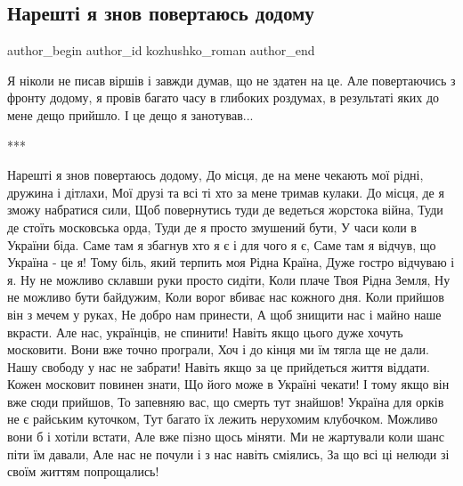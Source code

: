  
 
 
 
 
 
\subsection{Нарешті я знов повертаюсь додому}
\label{sec:30_11_2022.fb.kozhushko_roman.1.dodomu}
 
\ifcmt
 author_begin
   author_id kozhushko_roman
 author_end
\fi

Я ніколи не писав віршів і завжди думав, що не здатен на це. Але повертаючись з
фронту додому, я провів багато часу в глибоких роздумах, в результаті яких до
мене дещо прийшло. І це дещо я занотував...

***

\obeycr
Нарешті я знов повертаюсь додому,
До місця, де на мене чекають мої рідні, дружина і дітлахи,
Мої друзі та всі ті хто за мене тримав кулаки.
До місця, де я зможу набратися сили, 
Щоб повернутись туди де ведеться жорстока війна,
Туди де стоїть московська орда, 
Туди де я просто змушений бути,
У часи коли в України біда.
Саме там я збагнув хто я є і для чого я є, 
Саме там я відчув, що Україна - це я!
Тому біль, який терпить моя Рідна Країна,
Дуже гостро відчуваю і я.
Ну не можливо склавши руки просто сидіти,
Коли плаче Твоя Рідна Земля,
Ну не можливо бути байдужим,
Коли ворог вбиває нас кожного дня.
Коли прийшов він з мечем у руках,
Не добро нам принести, 
А щоб знищити нас і майно наше вкрасти.
Але нас, українців, не спинити!
Навіть якщо цього дуже хочуть московити.
Вони вже точно програли,
Хоч і до кінця ми їм тягла ще не дали.
Нашу свободу у нас не забрати!
Навіть якщо за це прийдеться життя віддати.
Кожен московит повинен знати,
Що його може в Україні чекати!
І тому якщо він вже сюди прийшов,
То запевняю вас, що смерть тут знайшов! Україна для орків не є райським куточком,
Тут багато їх лежить нерухомим клубочком.
Можливо вони б і хотіли встати,
Але вже пізно щось міняти.
Ми не жартували коли шанс піти їм давали,
Але нас не почули і з нас навіть сміялись,
За що всі ці нелюди зі своїм життям попрощались!
\restorecr
